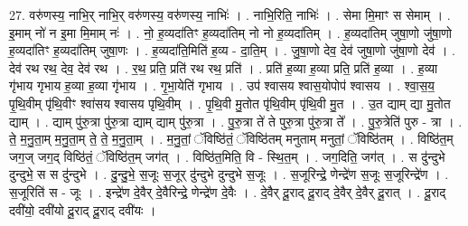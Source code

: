 \documentclass[17pt]{extarticle}
\begin{document}
27. वरु॑णस्य॒ नाभि॒र् नाभि॒र् वरु॑णस्य॒ वरु॑णस्य॒ नाभिः॑ । . नाभि॒रिति॒ नाभिः॑ । . सेमा मि॒माꣳ स सेमाम् । . इ॒माम् नो॑ न इ॒मा मि॒माम् नः॑ । . नो॒ ह॒व्यदा॑तिꣳ ह॒व्यदा॑तिम् नो नो ह॒व्यदा॑तिम् । . ह॒व्यदा॑तिम् जुषा॒णो जु॑षा॒णो ह॒व्यदा॑तिꣳ ह॒व्यदा॑तिम् जुषा॒णः । . ह॒व्यदा॑ति॒मिति॑ ह॒व्य - दा॒ति॒म् । . जु॒षा॒णो देव॒ देव॑ जुषा॒णो जु॑षा॒णो देव॑ । . देव॑ रथ रथ॒ देव॒ देव॑ रथ । . र॒थ॒ प्रति॒ प्रति॑ रथ रथ॒ प्रति॑ । . प्रति॑ ह॒व्या ह॒व्या प्रति॒ प्रति॑ ह॒व्या । . ह॒व्या गृ॑भाय गृभाय ह॒व्या ह॒व्या गृ॑भाय । . गृ॒भा॒येति॑ गृभाय । . उप॑ श्वासय श्वास॒योपोप॑ श्वासय । . श्वा॒स॒य॒ पृ॒थि॒वीम् पृ॑थि॒वीꣳ श्वा॑सय श्वासय पृथि॒वीम् । . पृ॒थि॒वी मु॒तोत पृ॑थि॒वीम् पृ॑थि॒वी मु॒त । . उ॒त द्याम् द्या मु॒तोत द्याम् । . द्याम् पु॑रु॒त्रा पु॑रु॒त्रा द्याम् द्याम् पु॑रु॒त्रा । . पु॒रु॒त्रा ते॑ ते पुरु॒त्रा पु॑रु॒त्रा ते᳚ । . पु॒रु॒त्रेति॑ पुरु - त्रा । . ते॒ म॒नु॒ता॒म् म॒नु॒ता॒म् ते॒ ते॒ म॒नु॒ता॒म् । . म॒नु॒तां॒ ॅविष्ठि॑तं॒ ॅविष्ठि॑तम् मनुताम् मनुतां॒ ॅविष्ठि॑तम् । . विष्ठि॑त॒म् जग॒ज् जग॒द् विष्ठि॑तं॒ ॅविष्ठि॑त॒म् जग॑त् । . विष्ठि॑त॒मिति॒ वि - स्थि॒त॒म् । . जग॒दिति॒ जग॑त् । . स दु॑न्दुभे दुन्दुभे॒ स स दु॑न्दुभे । . दु॒न्दु॒भे॒ स॒जूः स॒जूर् दु॑न्दुभे दुन्दुभे स॒जूः । . स॒जूरिन्द्रे॒ णेन्द्रे॑ण स॒जूः स॒जूरिन्द्रे॑ण । . स॒जूरिति॑ स - जूः । . इन्द्रे॑ण दे॒वैर् दे॒वैरिन्द्रे॒ णेन्द्रे॑ण दे॒वैः । . दे॒वैर् दू॒राद् दू॒राद् दे॒वैर् दे॒वैर् दू॒रात् । . दू॒राद् दवी॑यो॒ दवी॑यो दू॒राद् दू॒राद् दवी॑यः । \newline
\end{document}
